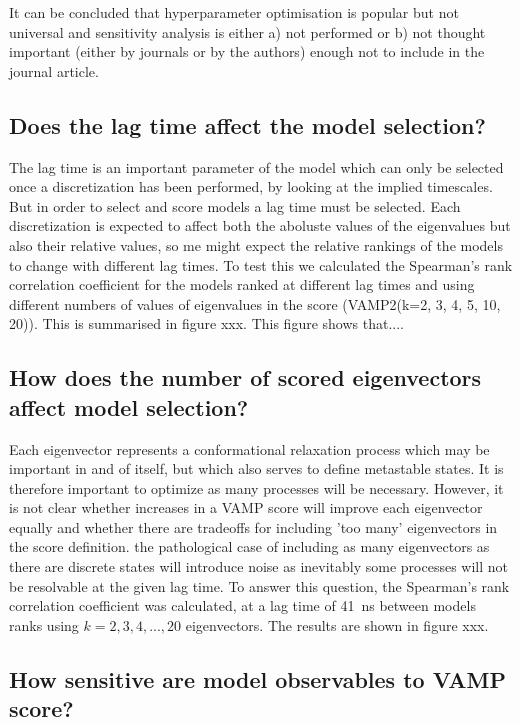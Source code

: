 \documentclass[journal=jacsat,manuscript=article]{achemso}
\begin{document}
It can be concluded that hyperparameter optimisation is popular but not universal and sensitivity analysis is either a) not performed or b) not thought important (either by journals or by the authors) enough not to include in the journal article. 


\subsection{Does the lag time affect the model selection?}

The lag time is an important parameter of the model which can only be selected once a discretization has been performed, by looking at the implied timescales.  But in order to select and score models a lag time must be selected. Each discretization is expected to affect both the aboluste values of the eigenvalues but also their relative values, so me might expect the relative rankings of the models to change with different lag times.  To test this we calculated the Spearman's rank correlation coefficient for the models ranked at different lag times and using different numbers of values of eigenvalues in the score (VAMP2(k=2, 3, 4, 5, 10, 20)). This is summarised in figure xxx.  This figure shows that....


\subsection{How does the number of scored eigenvectors affect model selection?}

Each eigenvector represents a conformational relaxation process which may be important in and of itself, but which also serves to define metastable states. It is therefore important to optimize as many processes will be necessary. However, it is not clear whether increases in a VAMP score will improve each eigenvector equally and whether there are tradeoffs for including 'too many' eigenvectors in the score definition. the pathological case of including as many eigenvectors as there are discrete states will introduce noise as inevitably some processes will not be resolvable at the given lag time.  To answer this question, the Spearman's rank correlation coefficient was calculated, at a lag time of \SI{41}{\nano\second}  between models ranks using $k=2, 3, 4, ..., 20$ eigenvectors.  The results are shown in figure xxx. 


\subsection{How sensitive are model observables to VAMP score?}
\end{document}
